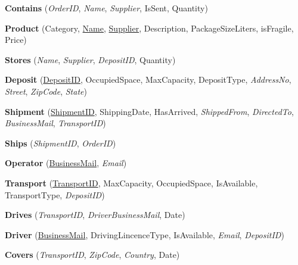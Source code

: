 \textbf{Contains} (\textit{OrderID}, \textit{Name}, \textit{Supplier}, IsSent, Quantity)

\textbf{Product} (Category, \underline{Name}, \underline{Supplier}, Description, PackageSizeLiters, isFragile, Price)

\textbf{Stores} (\textit{Name}, \textit{Supplier}, \textit{DepositID}, Quantity)

\textbf{Deposit} (\underline{DepositID}, OccupiedSpace, MaxCapacity, DepositType, \textit{AddressNo}, \textit{Street}, \textit{ZipCode}, \textit{State})

\textbf{Shipment} (\underline{ShipmentID}, ShippingDate, HasArrived, \textit{ShippedFrom}, \textit{DirectedTo}, \textit{BusinessMail}, \textit{TransportID})

\textbf{Ships} (\textit{ShipmentID}, \textit{OrderID})

\textbf{Operator} (\underline{BusinessMail}, \textit{Email})

\textbf{Transport} (\underline{TransportID}, MaxCapacity, OccupiedSpace, IsAvailable, TransportType, \textit{DepositID}) 

\textbf{Drives} (\textit{TransportID}, \textit{DriverBusinessMail}, Date)

\textbf{Driver} (\underline{BusinessMail}, DrivingLincenceType, IsAvailable, \textit{Email}, \textit{DepositID})

\textbf{Covers} (\textit{TransportID}, \textit{ZipCode}, \textit{Country}, Date)

